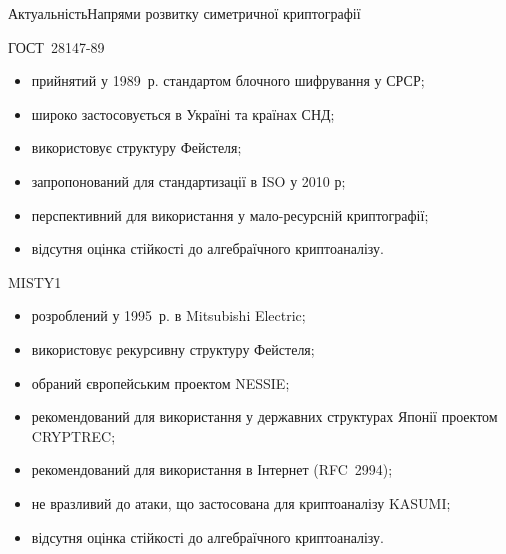 \documentclass[10pt, ucs]{beamer}
\begin{document}
\begin{frame}[shrink=1.2]{Актуальність}{Напрями розвитку симетричної криптографії}
    \footnotesize
    \begin{block}{ГОСТ~28147-89}
        \begin{itemize}
            \item прийнятий у 1989~р. стандартом блочного шифрування у СРСР;
            \item широко застосовується в Україні та країнах СНД;
            \item використовує структуру Фейстеля;
            \item запропонований для стандартизації в ISO у 2010 р;
            \item перспективний для використання у мало-ресурсній криптографії;
            \item відсутня оцінка стійкості до алгебраїчного криптоаналізу.
        \end{itemize}
    \end{block}
    \begin{block}{MISTY1}
        \begin{itemize}
            \item розроблений у 1995~р. в Mitsubishi Electric;
            \item використовує рекурсивну структуру Фейстеля;
            \item обраний європейським проектом NESSIE;
            \item рекомендований для використання у державних структурах Японії
                проектом CRYPTREC;
            \item рекомендований для використання в Інтернет (RFC~2994);
            \item не вразливий до атаки, що застосована для криптоаналізу KASUMI;
            \item відсутня оцінка стійкості до алгебраїчного криптоаналізу.
        \end{itemize}
    \end{block}
\end{frame}
\end{document}
